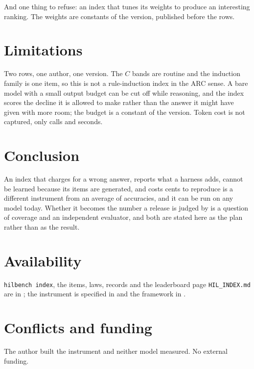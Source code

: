 \documentclass[11pt]{article}
\theoremstyle{definition}
\begin{document}
And one thing to refuse: an index that tunes its weights to produce an interesting ranking. The weights are constants of the version, published before the rows.

\section{Limitations}\label{sec:limits}

Two rows, one author, one version. The $C$ bands are routine and the induction family is one item, so this is not a rule-induction index in the ARC sense. A bare model with a small output budget can be cut off while reasoning, and the index scores the decline it is allowed to make rather than the answer it might have given with more room; the budget is a constant of the version. Token cost is not captured, only calls and seconds.

\section{Conclusion}

An index that charges for a wrong answer, reports what a harness adds, cannot be learned because its items are generated, and costs cents to reproduce is a different instrument from an average of accuracies, and it can be run on any model today. Whether it becomes the number a release is judged by is a question of coverage and an independent evaluator, and both are stated here as the plan rather than as the result.

\section*{Availability}

\texttt{hilbench index}, the items, laws, records and the leaderboard page \texttt{HIL\_INDEX.md} are in \citet{yang2026hilbench}; the instrument is specified in \citet{yang2026hilbenchpaper} and the framework in \citet{yang2026unified}.

\section*{Conflicts and funding}

The author built the instrument and neither model measured. No external funding.



\end{document}
